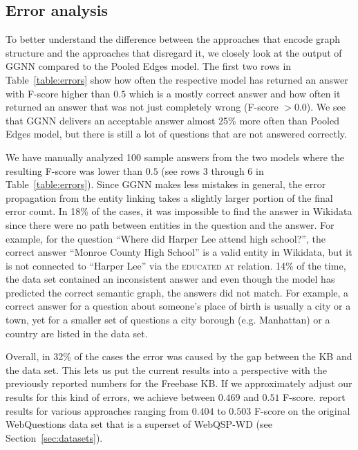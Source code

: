 \documentclass[11pt]{article}
\begin{document}
\subsection{Error analysis}
\label{sec:error}

To better understand the difference between the approaches that encode graph structure and the approaches that disregard it, we closely look at the output of GGNN compared to the Pooled Edges model. The first two rows in Table~\ref{table:errors} show how often the respective model has returned an answer with F-score higher than $0.5$ which is a mostly correct answer and how often it returned an answer that was not just completely wrong (F-score $> 0.0$). We see that GGNN delivers an acceptable answer almost 25\% more often than Pooled Edges model, but there is still a lot of questions that are not answered correctly.

We have manually analyzed 100 sample answers from the two models where the resulting F-score was lower than $0.5$ (see rows 3 through 6 in  Table~\ref{table:errors}). Since GGNN makes less mistakes in general, the error propagation from the entity linking takes a slightly larger portion of the final error count. In 18\% of the cases, it was impossible to find the answer in Wikidata since there were no path between entities in the question and the answer. For example, for the question ``Where did Harper Lee attend high school?'', the correct answer ``Monroe County High School'' is a valid entity in Wikidata, but it is not connected to ``Harper Lee'' via the \textsc{educated at} relation. 14\% of the time, the data set contained an inconsistent answer and even though the model has predicted the correct semantic graph, the answers did not match. For example, a correct answer for a question about someone's place of birth is usually a city or a town, yet for a smaller set of questions a city borough (e.g. Manhattan) or a country are listed in the data set. 

Overall, in 32\% of the cases the error was caused by the gap between the KB and the data set. 
This lets us put the current results into a perspective with the previously reported numbers for the Freebase KB. If we approximately adjust our results for this kind of errors, we achieve between $0.469$ and $0.51$ F-score.  report results for various approaches ranging from $0.404$ to $0.503$ F-score on the original WebQuestions data set that is a superset of WebQSP-WD (see Section~\ref{sec:datasets}). 
\end{document}
